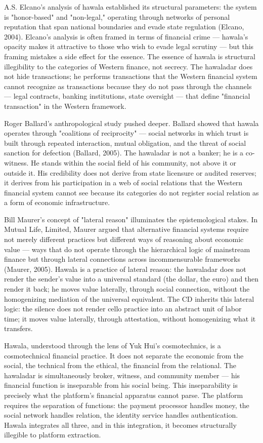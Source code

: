 A.S. Elcano's analysis of hawala established its structural parameters: the system is "honor-based" and "non-legal," operating through networks of personal reputation that span national boundaries and evade state regulation (Elcano, 2004). Elcano's analysis is often framed in terms of financial crime — hawala's opacity makes it attractive to those who wish to evade legal scrutiny — but this framing mistakes a side effect for the essence. The essence of hawala is structural illegibility to the categories of Western finance, not secrecy. The hawaladar does not hide transactions; he performs transactions that the Western financial system cannot recognize as transactions because they do not pass through the channels — legal contracts, banking institutions, state oversight — that define "financial transaction" in the Western framework.

Roger Ballard's anthropological study pushed deeper. Ballard showed that hawala operates through "coalitions of reciprocity" — social networks in which trust is built through repeated interaction, mutual obligation, and the threat of social sanction for defection (Ballard, 2005). The hawaladar is not a banker; he is a co-witness. He stands within the social field of his community, not above it or outside it. His credibility does not derive from state licensure or audited reserves; it derives from his participation in a web of social relations that the Western financial system cannot see because its categories do not register social relation as a form of economic infrastructure.

Bill Maurer's concept of "lateral reason" illuminates the epistemological stakes. In Mutual Life, Limited, Maurer argued that alternative financial systems require not merely different practices but different ways of reasoning about economic value — ways that do not operate through the hierarchical logic of mainstream finance but through lateral connections across incommensurable frameworks (Maurer, 2005). Hawala is a practice of lateral reason: the hawaladar does not render the sender's value into a universal standard (the dollar, the euro) and then render it back; he moves value laterally, through social connection, without the homogenizing mediation of the universal equivalent. The CD inherits this lateral logic: the silence does not render cello practice into an abstract unit of labor time; it moves value laterally, through attestation, without homogenizing what it transfers.

Hawala, understood through the lens of Yuk Hui's cosmotechnics, is a cosmotechnical financial practice. It does not separate the economic from the social, the technical from the ethical, the financial from the relational. The hawaladar is simultaneously broker, witness, and community member — his financial function is inseparable from his social being. This inseparability is precisely what the platform's financial apparatus cannot parse. The platform requires the separation of functions: the payment processor handles money, the social network handles relation, the identity service handles authentication. Hawala integrates all three, and in this integration, it becomes structurally illegible to platform extraction.

